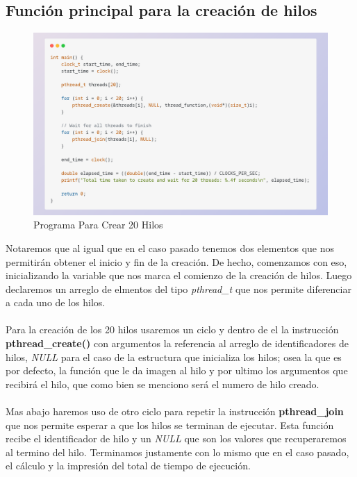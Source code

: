\documentclass[10pt]{article}
\begin{document}
	\subsection{Función principal para la creación de hilos}
	\begin{figure}[h!]
		\centering
		\includegraphics[width=\linewidth]{pvh2.png}
		\caption{Programa Para Crear 20 Hilos}
		\label{fig:pvh2}
	\end{figure}
	Notaremos que al igual que en el caso pasado tenemos dos elementos que nos permitirán obtener el inicio y fin de la creación. De hecho, comenzamos con eso,  inicializando  la variable que nos marca el comienzo de la creación de hilos. Luego declaremos un arreglo de elmentos del tipo \textit{pthread\_t} que nos permite diferenciar a cada uno de los hilos. 
	\\\\
	Para la creación de los 20 hilos usaremos un ciclo y dentro de el la instrucción \textbf{pthread\_create()} con argumentos la referencia al arreglo de identificadores de hilos, \textit{NULL} para el caso de la estructura que inicializa los hilos; osea la que es por defecto, la función que le da imagen al hilo y por ultimo los argumentos que recibirá el hilo, que como bien se menciono será el numero de hilo creado. 
	\\\\
	Mas abajo haremos uso de otro ciclo para repetir la instrucción \textbf{pthread\_join} que nos permite esperar a que los hilos se terminan de ejecutar. Esta función recibe el identificador de hilo y un \textit{NULL} que son los valores que recuperaremos al termino del hilo. Terminamos justamente con lo mismo que en el caso pasado, el cálculo y la impresión del total de tiempo de ejecución. 
		
\end{document}
